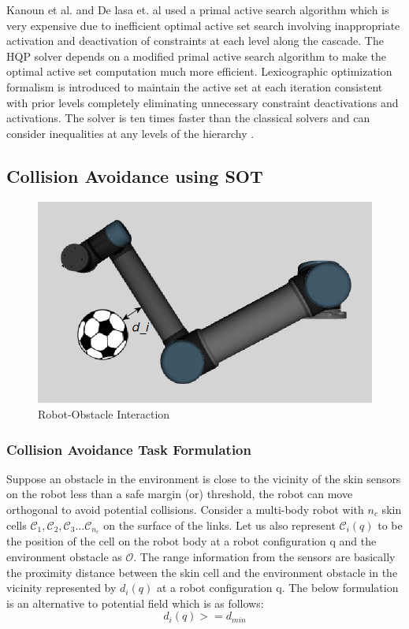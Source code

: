 Kanoun et al. and De lasa et. al used a primal active search algorithm which is very expensive due to inefficient optimal active set search involving inappropriate activation and deactivation of constraints at each level along the cascade\cite{de2010feature}\cite{kanoun2011kinematic}. The HQP solver depends on a modified primal active search algorithm to make the optimal active set computation much more efficient. Lexicographic optimization formalism is introduced to maintain the active set at each iteration consistent with prior levels completely eliminating unnecessary constraint deactivations and activations. The solver is ten times faster than the classical solvers and can consider inequalities at any levels of the
hierarchy \cite{escande2014hierarchical}.

\subsection{Collision Avoidance using SOT}
   \begin{figure}[thpb]
      \centering
      \includegraphics[scale=0.5]{chapters/doa/images/robot-obstacle_raw.png}
      \caption{Robot-Obstacle Interaction }
      \label{gso}
   \end{figure}
\subsubsection{Collision Avoidance Task Formulation}
Suppose an obstacle in the environment is close to the vicinity of the skin sensors on the robot less than a safe margin (or) threshold, the robot can move orthogonal to avoid potential collisions. Consider a multi-body robot with $n_c$ skin cells $\mathcal{C}_1,\mathcal{C}_2,\mathcal{C}_3 ... \mathcal{C}_{n_c}$ on the surface of the links. Let us also represent $\mathcal{C}_i(q)$ to be the position of the cell on the robot body  at a robot configuration q and the environment obstacle as $\mathcal{O}$. The range information from the sensors are basically the proximity distance between the skin cell and the environment obstacle in the vicinity represented by $d_i(q)$ at a robot configuration q. The below formulation is an alternative to potential field which is as follows:   
\begin{equation} \label{eq:d_ineq} 
d_i(q)  >= d_{min}
\end{equation}

